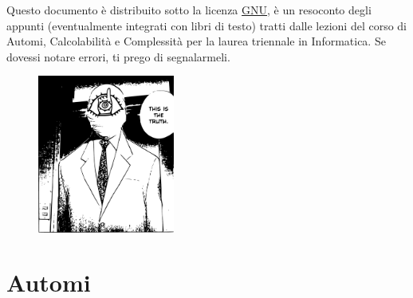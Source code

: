 \documentclass[10pt, letterpaper]{report}
\begin{document}
\newpage
\pagecolor{cartaRiciclata}%
\Large
Questo documento è distribuito sotto la licenza 
\color{blue}\href{https://www.gnu.org/licenses/fdl-1.3.txt}{GNU}\color{black},  
è un resoconto degli appunti (eventualmente integrati con libri di testo) tratti dalle lezioni del corso di Automi, Calcolabilità e Complessità
\hphantom{a}per la laurea 
triennale in Informatica. Se dovessi notare errori, ti prego di segnalarmeli.
\vfill
\begin{figure}[h!]
    \raggedright
    \includegraphics[width=0.4\textwidth,right ]{../../../preamble/tomodachi.pdf} 
\end{figure}
\newpage %
\normalsize
\tableofcontents 
\newpage

\fancyhf{}
\fancyhead[L]{\nouppercase{\leftmark}}
\fancyfoot[C]{\thepage}


\chapter{Automi}
\end{document}
